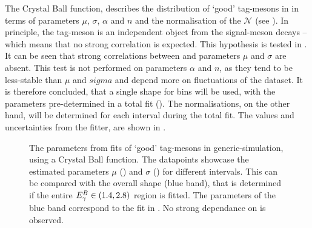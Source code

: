 The Crystal Ball function, describes the distribution of `good' tag-\B mesons in \Mbc in terms of parameters $\mu$, $\sigma$, $\alpha$ and $n$ and the normalisation of the \PDF $\mathcal{N}$ (see ).
In principle, the tag-\B meson is an independent object from the signal-\B meson decays -- which means that no strong \EB correlation is expected.
This hypothesis is tested in .
It can be seen that strong correlations between \EB and parameters $\mu$ and $\sigma$ are absent.
This test is not performed on parameters $\alpha$ and $n$, as they tend to be less-stable than $\mu$ and $sigma$ and depend more on fluctuations of the dataset.
It is therefore concluded, that a single \Mbc shape for \EB bins will be used, with the parameters pre-determined in a total fit ().
The normalisations, on the other hand, will be determined for each \EB interval during the total fit.
The values and uncertainties from the fitter, are shown in .

\begin{figure}[htbp!]
    \caption{\label{fig:crystal_ball_par_test}The parameters from \Mbc fits of `good' tag-\B mesons in generic-\BB simulation, using a Crystal Ball function.
    The datapoints showcase the estimated parameters $\mu$ () and $\sigma$ () for different
    \EB intervals.
    This can be compared with the overall shape (blue band), that is determined if the entire ${E^B_{\gamma}}\in(1.4,2.8)$ region is fitted.
    The parameters of the blue band correspond to the fit in .
    No strong dependance on \EB is observed.
    }
\end{figure}

